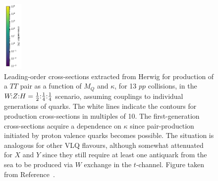 \begin{figure}[tbp]
\vspace{-0.4cm}
\includegraphics[height=3.5cm]{Figures/VLQ/xsScans/3rdGen/cbar.pdf} %
\caption{Leading-order cross-sections extracted from Herwig for production of a $TT$ pair as a
  function of $M_Q$ and $\kappa$, for \unit{13}{\TeV} $pp$ collisions, in the
  $\text{$W\!$:$Z$:$H$} = \text{$\tfrac{1}{2}$:$\tfrac{1}{4}$:$\tfrac{1}{4}$}$ scenario, assuming couplings to individual generations of
  quarks.  The white lines indicate the contours for production cross-sections
  in multiples of 10. The first-generation cross-sections acquire a dependence
  on $\kappa$ since pair-production initiated by proton valence quarks becomes
  possible.  The situation is analogous for other VLQ flavours, although
  somewhat attenuated for $X$ and $Y$ since they still require at least one
  antiquark from the sea to be produced via $W$ exchange in the $t$-channel. Figure taken from Reference~\cite{VLQ_contur}.}
\label{fig:TTproduction}
\end{figure}

